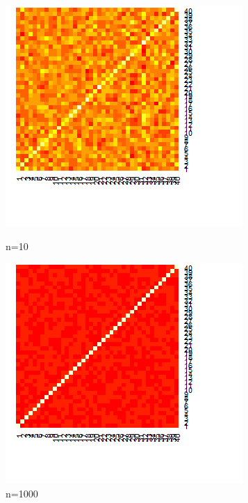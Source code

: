 \documentclass[paper=letter, fontsize=14pt]{scrartcl}
\numberwithin{equation}{section} %
\numberwithin{figure}{section} %
\numberwithin{table}{section} %
\begin{document}
\begin{figure}[h]
  \centering
  \begin{minipage}[b]{0.4\textwidth}
    \includegraphics[width=\textwidth]{i6.png}
    \caption{n=10}
  \end{minipage}
  \hfill
  \begin{minipage}[b]{0.4\textwidth}
    \includegraphics[width=\textwidth]{i7.png}
    \caption{n=1000}
  \end{minipage}
\end{figure}
\end{document}

